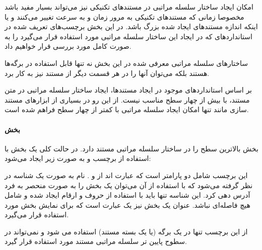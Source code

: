 امکان ایجاد ساختار سلسله مراتبی در مستندهای تکنیکی نیز می‌تواند بسیار مفید باشد
مخصوصا زمانی که مستندهای تکنیکی به مرور زمان و به سرعت تغییر می‌کنند و یا اینکه
اندازه مستندهای ایجاد شده بزرگ باشد. در این بخش برچسب‌های تعریف شده در
استانداردهای  که در ایجاد این ساختار سلسله مراتبی مورد استفاده قرار
می‌گیرد را به صورت کامل مورد بررسی قرار خواهیم داد.

\begin{note}
ساختارهای سلسله مراتبی معرفی شده در این بخش نه تنها قابل استفاده در برگه‌ها
هستند بلکه می‌توان آنها را در هر قسمت دیگر از مستند نیز به کار برد.
\end{note}

\begin{info}
بر اساس استانداردهای موجود در ایجاد مستندها، ایجاد ساختار سلسله مراتبی در متن
مستند، با بیش از چهار سطح مناسب نیست.  از این رو در بسیاری از ابزارهای مستند
سازی مانند  تنها امکان ایجاد سلسله مراتبی با کمتر از چهار سطح فراهم
شده است.
\end{info}

\paragraph{بخش}

بخش بالاترین سطح را در ساختار سلسله مراتبی مستند دارد.
در حالت کلی یک بخش با استفاده از برچسب \lr{\\Section} و به صورت زیر ایجاد
می‌شود:



این برچسب شامل دو پارامتر است که عبارت اند از  و . نام به صورت یک شناسه در نظر گرفته می‌شود که با استفاده از آن می‌توان یک
بخش را به صورت منحصر به فرد آدرس دهی کرد. این شناسه تنها باید با استفاده از حروف
و ارقام ایجاد شده و شامل هیچ فاصله‌ای نباشد. عنوان یک بخش نیز یک عبارت است که
برای نمایش بخش مورد استفاده قرار می‌گیرد.

\begin{warning}
از این برچسب تنها در یک برگه (یا یک بسته مستند) استفاده می شود و نمی‌تواند در
سطوح پایین تر سلسله مراتبی مستند مورد استفاده قرار گیرد.
\end{warning}
    

